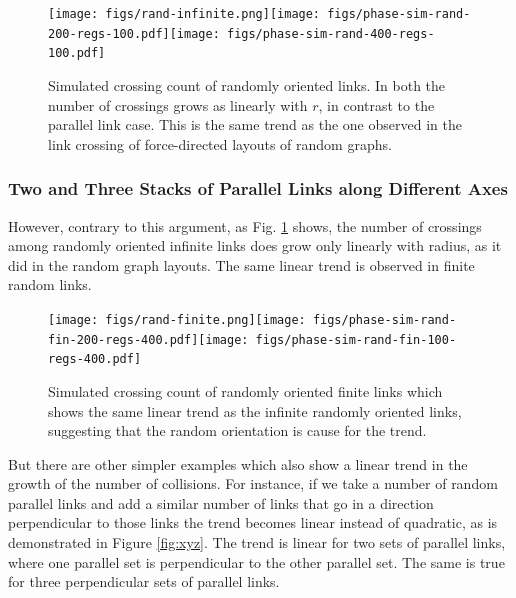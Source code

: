 \documentclass[endfloats,nofootinbib,preprint,floatfix,titlepage,superscriptaddress,linenumbers]{revtex4-1} %
\begin{document}
\begin{figure}
    \centering
    \texttt{[image: figs/rand-infinite.png]}\texttt{[image: figs/phase-sim-rand-200-regs-100.pdf]}\texttt{[image: figs/phase-sim-rand-400-regs-100.pdf]}
    \caption{\scriptsize Simulated crossing count of  randomly oriented links. In both the number of crossings grows as linearly with $r$, in contrast to the parallel link case. This is the same trend as the one observed in the link crossing of force-directed layouts of random graphs.}
    \label{fig:simrand}
\end{figure}

\subsubsection{Two and Three Stacks of Parallel Links along Different Axes}

However, contrary to this argument, as Fig. \ref{fig:simrand} shows, the number of crossings among randomly oriented infinite links does grow only linearly with radius, as it did in the random graph layouts. The same linear trend is observed in finite random links.  

\begin{figure}
    \centering
    \texttt{[image: figs/rand-finite.png]}\texttt{[image: figs/phase-sim-rand-fin-200-regs-400.pdf]}\texttt{[image: figs/phase-sim-rand-fin-100-regs-400.pdf]}
    \caption{\scriptsize Simulated crossing count of  randomly oriented finite links which shows the same linear trend as the infinite randomly oriented links, suggesting that the random orientation is cause for the trend.}
    \label{fig:simfin}
\end{figure}



But there are other simpler examples which also show a linear trend in the growth of the number of collisions. For instance, if we take a number of random parallel links and add a similar number of links that go in a direction perpendicular to those links the trend becomes linear instead of quadratic, as is demonstrated in Figure \ref{fig:xyz}. The trend is linear for two sets of parallel links, where one parallel set is perpendicular to the other parallel set. The same is true for three perpendicular sets of parallel links. 
\end{document}
